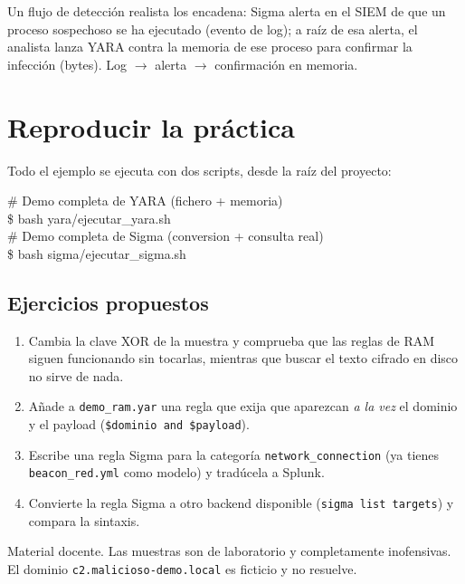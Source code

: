 \documentclass[11pt,a4paper]{article}
\begin{document}
\begin{ideaclave}
Un flujo de detección realista los encadena: Sigma alerta en el SIEM de que un
proceso sospechoso se ha ejecutado (evento de log); a raíz de esa alerta, el
analista lanza YARA contra la memoria de ese proceso para confirmar la infección
(bytes). Log $\rightarrow$ alerta $\rightarrow$ confirmación en memoria.
\end{ideaclave}

\section{Reproducir la práctica}

Todo el ejemplo se ejecuta con dos scripts, desde la raíz del proyecto:

\begin{terminal}
\# Demo completa de YARA (fichero + memoria)\\
\$ bash yara/ejecutar\_yara.sh\\[6pt]
\# Demo completa de Sigma (conversion + consulta real)\\
\$ bash sigma/ejecutar\_sigma.sh
\end{terminal}

\subsection*{Ejercicios propuestos}

\begin{enumerate}[leftmargin=1.6em]
  \item Cambia la clave XOR de la muestra y comprueba que las reglas de RAM siguen
        funcionando sin tocarlas, mientras que buscar el texto cifrado en disco no
        sirve de nada.
  \item Añade a \texttt{demo\_ram.yar} una regla que exija que aparezcan
        \emph{a la vez} el dominio y el payload (\texttt{\$dominio and \$payload}).
  \item Escribe una regla Sigma para la categoría \texttt{network\_connection}
        (ya tienes \texttt{beacon\_red.yml} como modelo) y tradúcela a Splunk.
  \item Convierte la regla Sigma a otro backend disponible
        (\texttt{sigma list targets}) y compara la sintaxis.
\end{enumerate}

\vfill
\begin{center}
\small\color{comentario}
Material docente. Las muestras son de laboratorio y completamente inofensivas.
El dominio \texttt{c2.malicioso-demo.local} es ficticio y no resuelve.
\end{center}
\end{document}
